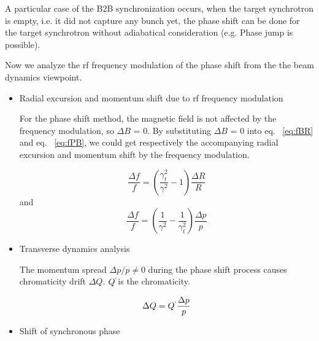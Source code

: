 A particular case of the B2B synchronization occurs, when the target synchrotron is empty, i.e. it did not capture any bunch yet, the phase shift can be done for the target synchrotron without adiabatical consideration (e.g. Phase jump is possible).

Now we analyze the rf frequency modulation of the phase shift from the the beam dynamics viewpoint.
\begin{itemize}
	\item Radial excursion and momentum shift due to rf frequency modulation

For the phase shift method, the magnetic field is not affected by the frequency modulation, so $\Delta{B}$ = 0. By substituting $\Delta{B}$ = 0 into eq. ~\ref{eq:fBR} and eq. ~\ref{eq:fPB}, we could get respectively the accompanying radial excursion and momentum shift    by the frequency modulation.

\begin{equation}
\label{eq:phaseR}
\frac{\Delta{f}}{f} =({\frac{\gamma_t^2}{\gamma^2}-1}) \frac{\Delta{R}}{R}
\end{equation}
and
\begin{equation}
\frac{\Delta{f}}{f} = (\frac{1}{\gamma^2}-\frac{1}{\gamma_t^2})\frac{\Delta{p}}{p}
\label{eq:phaseP}
\end{equation}

	\item Transverse dynamics analysis

The momentum spread ${\Delta{p}}/{p} \neq 0$ during the phase shift process causes chromaticity drift $\Delta{Q}$. $Q^`$is the chromaticity.

\begin{equation}
\Delta{Q} = Q^`\frac{\Delta{p}}{p}
\label{eq:chromaticity}
\end{equation} 
	\item Shift of synchronous phase


\end{itemize}
